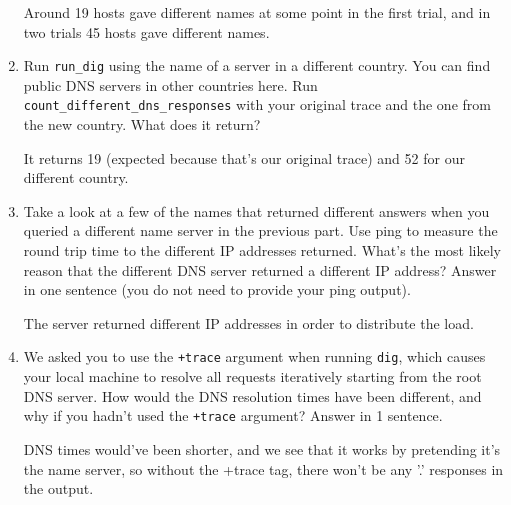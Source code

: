 \documentclass[10pt]{article}
\begin{document}
\begin{enumerate}
Around 19 hosts gave different names at some point in the first trial, and in two trials 45 hosts gave different names.

\item Run \texttt{run\_dig} using the name of a server in a different country. You can find public DNS servers in other countries here. 
Run \texttt{count\_different\_dns\_responses} with your original trace and the one from the new country. What does it return?

It returns 19 (expected because that's our original trace) and 52 for our different country.

\item Take a look at a few of the names that returned different answers when you queried a different name server in the previous part. Use ping to measure the round trip time to the different IP addresses returned. What's the most likely reason that the different DNS server returned a different IP address? Answer in one sentence (you do not need to provide your ping output).

The server returned different IP addresses in order to distribute the load.

\item We asked you to use the \texttt{+trace} argument when running \texttt{dig}, which causes your local machine to resolve all requests iteratively starting from the root DNS server. How would the DNS resolution times have been different, and why if you hadn't used the \texttt{+trace} argument? Answer in 1 sentence.

DNS times would've been shorter, and we see that it works by pretending it's the name server, so without the +trace tag, there won't be any '.' responses in the output.  

\end{enumerate}
\end{document}
